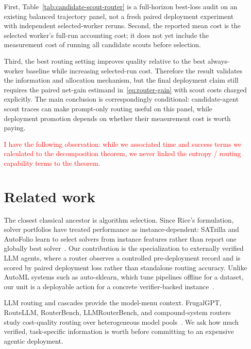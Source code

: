 \documentclass{article}
\newcounter{algorithm}
\begin{document}
First, Table~\ref{tab:candidate-scout-router} is a full-horizon best-loss audit on an existing balanced trajectory panel, not a fresh paired deployment experiment with independent selected-worker reruns.
Second, the reported mean cost is the selected worker's full-run accounting cost; it does not yet include the measurement cost of running all candidate scouts before selection.

Third, the best routing setting improves quality relative to the best always-worker baseline while increasing selected-run cost.
Therefore the result validates the information and allocation mechanism, but the final deployment claim still requires the paired net-gain estimand in~\eqref{eq:router-gain} with scout costs charged explicitly.
The main conclusion is correspondingly conditional: candidate-agent scout traces can make prompt-only routing useful on this panel, while deployment promotion depends on whether their measurement cost is worth paying.

\textcolor{red}{I have the following observation: while we associated time and success terms we calculated to the decomposition theorem, we never linked the entropy / routing capability terms to the theorem.}

\section{Related work}
\label{sec:related}

The closest classical ancestor is algorithm selection.
Since Rice's formulation, solver portfolios have treated performance as instance-dependent: SATzilla and AutoFolio learn to select solvers from instance features rather than report one globally best solver~\citep{rice1976algorithm,xu2012satzilla,lindauer2015autofolio,kotthoff2016algorithm}.
Our contribution is the specialization to externally verified LLM agents, where a router observes a controlled pre-deployment record and is scored by paired deployment loss rather than standalone routing accuracy.
Unlike AutoML systems such as auto-sklearn, which tune pipelines offline for a dataset, our unit is a deployable action for a concrete verifier-backed instance~\citep{feurer2015autosklearn}.

LLM routing and cascades provide the model-menu context.
FrugalGPT, RouteLLM, RouterBench, LLMRouterBench, and compound-system routers study cost-quality routing over heterogeneous model pools~\citep{chen2023frugalgpt,ong2024routellm,hu2024routerbench,anonymous2026llmrouterbench,chen2025optimizing,yue2025masrouter,zaharia2024compound}.
We ask how much verified, task-specific information is worth before committing to an expensive agentic deployment.
\end{document}
